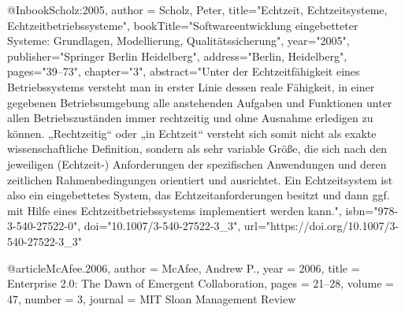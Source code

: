 @Inbook{Scholz:2005,
author = {Scholz, Peter},
title="Echtzeit, Echtzeitsysteme, Echtzeitbetriebssysteme",
bookTitle="Softwareentwicklung eingebetteter Systeme: Grundlagen, Modellierung, Qualit{\"a}tssicherung",
year="2005",
publisher="Springer Berlin Heidelberg",
address="Berlin, Heidelberg",
pages="39--73",
chapter="3",
abstract="Unter der Echtzeitf{\"a}higkeit eines Betriebssystems versteht man in erster Linie dessen reale F{\"a}higkeit, in einer gegebenen Betriebsumgebung alle anstehenden Aufgaben und Funktionen unter allen Betriebszust{\"a}nden immer rechtzeitig und ohne Ausnahme erledigen zu k{\"o}nnen. „Rechtzeitig`` oder „in Echtzeit`` versteht sich somit nicht als exakte wissenschaftliche Definition, sondern als sehr variable Gr{\"o}{\ss}e, die sich nach den jeweiligen (Echtzeit-) Anforderungen der spezifischen Anwendungen und deren zeitlichen Rahmenbedingungen orientiert und ausrichtet. Ein Echtzeitsystem ist also ein eingebettetes System, das Echtzeitanforderungen besitzt und dann ggf. mit Hilfe eines Echtzeitbetriebssystems implementiert werden kann.",
isbn="978-3-540-27522-0",
doi="10.1007/3-540-27522-3_3",
url="https://doi.org/10.1007/3-540-27522-3\_3"
}

@article{McAfee.2006,
 author = {McAfee, Andrew P.},
 year = {2006},
 title = {{E}nterprise 2.0: {T}he {D}awn of {E}mergent {C}ollaboration},
 pages = {21--28},
 volume = {47},
 number = {3},
 journal = {MIT Sloan Management Review}
}